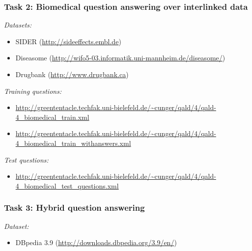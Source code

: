 \documentclass[a4paper]{article}
\begin{document}
{%
\subsubsection*{Task 2: Biomedical question answering over interlinked data}

{\em Datasets:}

\vspace{-.3cm}

\begin{itemize} 
\item SIDER (\url{http://sideeffects.embl.de})
\item Diseasome (\url{http://wifo5-03.informatik.uni-mannheim.de/diseasome/})
\item Drugbank (\url{http://www.drugbank.ca})
\end{itemize} 

{\em Training questions:} 

\vspace{-.3cm}

\begin{itemize} 
\item \url{http://greententacle.techfak.uni-bielefeld.de/~cunger/qald/4/qald-4_biomedical_train.xml} 
\item \url{http://greententacle.techfak.uni-bielefeld.de/~cunger/qald/4/qald-4_biomedical_train_withanswers.xml}
\end{itemize} 

{\em Test questions:} 

\vspace{-.3cm}

\begin{itemize}
\item \url{http://greententacle.techfak.uni-bielefeld.de/~cunger/qald/4/qald-4_biomedical_test_questions.xml} 
\end{itemize}

\subsubsection*{Task 3: Hybrid question answering}

{\em Dataset:} 

\vspace{-.3cm}

\begin{itemize} 
\item DBpedia 3.9 (\url{http://downloads.dbpedia.org/3.9/en/})
\end{itemize} 

}
\end{document}
